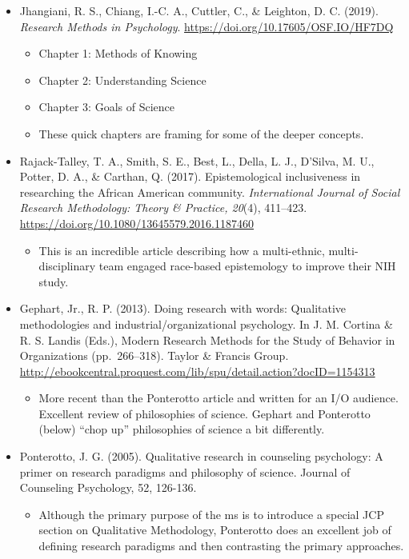 \documentclass[
  english,
]{book}
\providecommand{\tightlist}{%
  \setlength{\itemsep}{0pt}\setlength{\parskip}{0pt}}
\begin{document}
\begin{itemize}
\tightlist
\item
  Jhangiani, R. S., Chiang, I.-C. A., Cuttler, C., \& Leighton, D. C. (2019). \emph{Research Methods in Psychology}. \url{https://doi.org/10.17605/OSF.IO/HF7DQ}

  \begin{itemize}
  \tightlist
  \item
    Chapter 1: Methods of Knowing
  \item
    Chapter 2: Understanding Science
  \item
    Chapter 3: Goals of Science
  \item
    These quick chapters are framing for some of the deeper concepts.
  \end{itemize}
\item
  Rajack-Talley, T. A., Smith, S. E., Best, L., Della, L. J., D'Silva, M. U., Potter, D. A., \& Carthan, Q. (2017). Epistemological inclusiveness in researching the African American community. \emph{International Journal of Social Research Methodology: Theory \& Practice, 20}(4), 411--423. \url{https://doi.org/10.1080/13645579.2016.1187460}

  \begin{itemize}
  \tightlist
  \item
    This is an incredible article describing how a multi-ethnic, multi-disciplinary team engaged race-based epistemology to improve their NIH study.
  \end{itemize}
\item
  Gephart, Jr., R. P. (2013). Doing research with words: Qualitative methodologies and industrial/organizational psychology. In J. M. Cortina \& R. S. Landis (Eds.), Modern Research Methods for the Study of Behavior in Organizations (pp.~266--318). Taylor \& Francis Group. \url{http://ebookcentral.proquest.com/lib/spu/detail.action?docID=1154313}

  \begin{itemize}
  \tightlist
  \item
    More recent than the Ponterotto article and written for an I/O audience. Excellent review of philosophies of science. Gephart and Ponterotto (below) ``chop up'' philosophies of science a bit differently.
  \end{itemize}
\item
  Ponterotto, J. G. (2005). Qualitative research in counseling psychology: A primer on research paradigms and philosophy of science. Journal of Counseling Psychology, 52, 126-136.

  \begin{itemize}
  \tightlist
  \item
    Although the primary purpose of the ms is to introduce a special JCP section on Qualitative Methodology, Ponterotto does an excellent job of defining research paradigms and then contrasting the primary approaches.
  \end{itemize}
\end{itemize}
\end{document}
